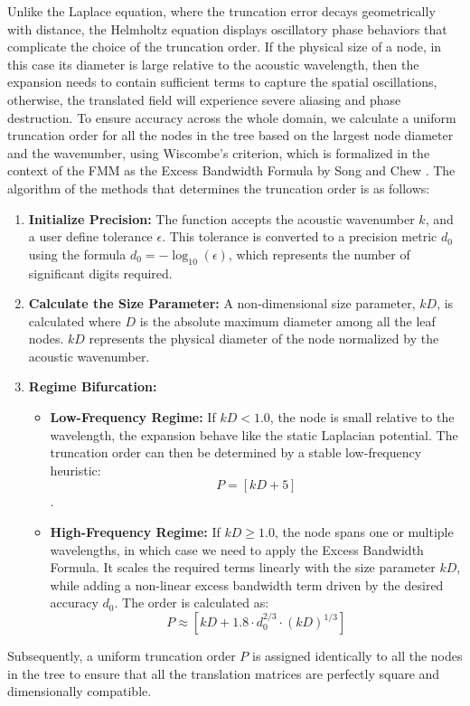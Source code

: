 Unlike the Laplace equation, where the truncation error decays geometrically with distance, the Helmholtz equation displays oscillatory phase behaviors that complicate the choice of the truncation order. If the physical size of a node, in this case its diameter is large relative to the acoustic wavelength, then the expansion needs to contain sufficient terms to capture the spatial oscillations, otherwise, the translated field will experience severe aliasing and phase destruction. To ensure accuracy across the whole domain, we calculate a uniform truncation order for all the nodes in the tree based on the largest node diameter and the wavenumber, using Wiscombe's criterion, which is formalized in the context of the \ac{FMM} as the Excess Bandwidth Formula by Song and Chew \cite{chewfastefficientalgorithms2001,wiscombeimprovedmiescattering1980}. The algorithm of the methods that determines the truncation order is as follows:
\begin{enumerate}
    \item \textbf{Initialize Precision:} The function accepts the acoustic wavenumber $k$, and a user define tolerance $\epsilon$. This tolerance is converted to a precision metric $d_0$ using the formula $d_0 = -\log_{10}(\epsilon)$, which represents the number of significant digits required.
    \item \textbf{Calculate the Size Parameter:} A non-dimensional size parameter, $kD$, is calculated where $D$ is the absolute maximum diameter among all the leaf nodes. $kD$ represents the physical diameter of the node normalized by the acoustic wavenumber.
    \item \textbf{Regime Bifurcation:}
    \begin{itemize}
        \item \textbf{Low-Frequency Regime:} If $kD < 1.0$, the node is small relative to the wavelength, the expansion behave like the static Laplacian potential. The truncation order can then be determined by a stable low-frequency heuristic: $$P = [kD + 5]$$.
        \item \textbf{High-Frequency Regime:} If $kD \geq 1.0$, the node spans one or multiple wavelengths, in which case we need to apply the Excess Bandwidth Formula. It scales the required terms linearly with the size parameter $kD$, while adding a non-linear excess bandwidth term driven by the desired accuracy $d_0$. The order is calculated as: $$P \approx [kD +1.8 \cdot d_0^{2/3} \cdot (kD)^{1/3}]$$
    \end{itemize}
\end {enumerate}

Subsequently, a uniform truncation order $P$ is assigned identically to all the nodes in the tree to ensure that all the translation matrices are perfectly square and dimensionally compatible.


